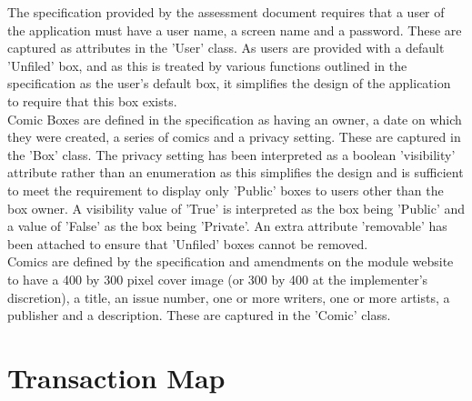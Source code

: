 \documentclass{scrreprt}
\begin{document}
The specification provided by the assessment document requires that a user of the application must have a user name, a screen name and a password. These are captured as attributes in the 'User' class. As users are provided with a default 'Unfiled' box, and as this is treated by various functions outlined in the specification as the user's default box, it simplifies the design of the application to require that this box exists.\\

Comic Boxes are defined in the specification as having an owner, a date on which they were created, a series of comics and a privacy setting. These are captured in the 'Box' class. The privacy setting has been interpreted as a boolean 'visibility' attribute rather than an enumeration as this simplifies the design and is sufficient to meet the requirement to display only 'Public' boxes to users other than the box owner. A visibility value of 'True' is interpreted as the box being 'Public' and a value of 'False' as the box being 'Private'. An extra attribute 'removable' has been attached to ensure that 'Unfiled' boxes cannot be removed.\\

Comics are defined by the specification and amendments on the module website to have a 400 by 300 pixel cover image (or 300 by 400 at the implementer's discretion), a title, an issue number, one or more writers, one or more artists, a publisher and a description. These are captured in the 'Comic' class.\\


\clearpage
\section{Transaction Map}
\end{document}
